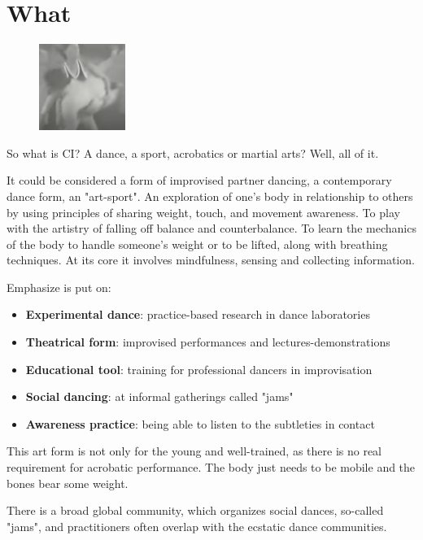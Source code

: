\section{What}

\begin{figure}
\centering
\includegraphics[width=0.25\textwidth]{images/what.jpg}
\end{figure}

So what is CI? A dance, a sport, acrobatics or martial arts? Well, all of it.

It could be considered a form of improvised partner dancing, a contemporary dance form, an "art-sport". An exploration of one's body in relationship to others by using principles of sharing weight, touch, and movement awareness. To play with the artistry of falling off balance and counterbalance. To learn the mechanics of the body to handle someone's weight or to be lifted, along with breathing techniques. At its core it involves mindfulness, sensing and collecting information.

Emphasize is put on:
\begin{itemize}
	\item \textbf{Experimental dance}: practice-based research in dance laboratories
	\item \textbf{Theatrical form}: improvised performances and lectures-demonstrations
	\item \textbf{Educational tool}: training for professional dancers in improvisation
	\item \textbf{Social dancing}: at informal gatherings called "jams"
	\item \textbf{Awareness practice}: being able to listen to the subtleties in contact
\end{itemize}

This art form is not only for the young and well-trained, as there is no real requirement for acrobatic performance. The body just needs to be mobile and the bones bear some weight.

There is a broad global community, which organizes social dances, so-called "jams", and practitioners often overlap with the ecstatic dance communities.


